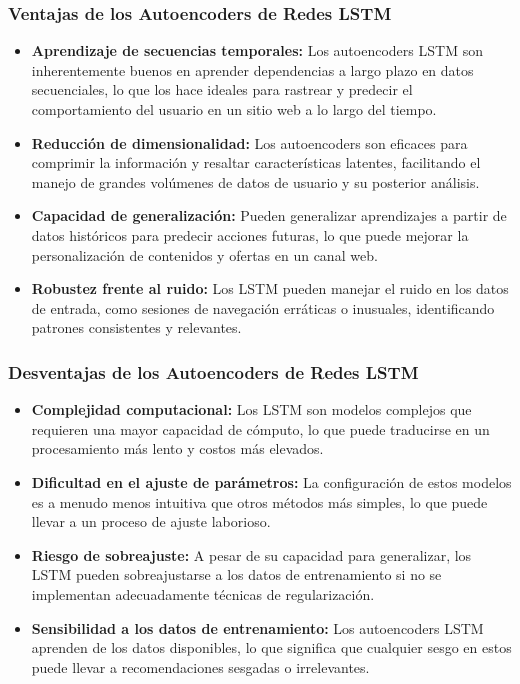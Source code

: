 \subsubsection{Ventajas de los Autoencoders de Redes LSTM}
\begin{itemize}
        \item \textbf{Aprendizaje de secuencias temporales:} Los autoencoders LSTM son inherentemente buenos en aprender dependencias a largo plazo en datos secuenciales, lo que los hace ideales para rastrear y predecir el comportamiento del usuario en un sitio web a lo largo del tiempo.
        \item \textbf{Reducción de dimensionalidad:}  Los autoencoders son eficaces para comprimir la información y resaltar características latentes, facilitando el manejo de grandes volúmenes de datos de usuario y su posterior análisis.
        \item \textbf{Capacidad de generalización:} Pueden generalizar aprendizajes a partir de datos históricos para predecir acciones futuras, lo que puede mejorar la personalización de contenidos y ofertas en un canal web.
        \item \textbf{Robustez frente al ruido:} Los LSTM pueden manejar el ruido en los datos de entrada, como sesiones de navegación erráticas o inusuales, identificando patrones consistentes y relevantes.
\end{itemize}

\subsubsection{Desventajas de los Autoencoders de Redes LSTM}
\begin{itemize}
        \item \textbf{Complejidad computacional:} Los LSTM son modelos complejos que requieren una mayor capacidad de cómputo, lo que puede traducirse en un procesamiento más lento y costos más elevados.
        \item \textbf{Dificultad en el ajuste de parámetros:} La configuración de estos modelos es a menudo menos intuitiva que otros métodos más simples, lo que puede llevar a un proceso de ajuste laborioso.
        \item \textbf{Riesgo de sobreajuste:} A pesar de su capacidad para generalizar, los LSTM pueden sobreajustarse a los datos de entrenamiento si no se implementan adecuadamente técnicas de regularización.
        \item \textbf{Sensibilidad a los datos de entrenamiento:} Los autoencoders LSTM aprenden de los datos disponibles, lo que significa que cualquier sesgo en estos puede llevar a recomendaciones sesgadas o irrelevantes.
\end{itemize}